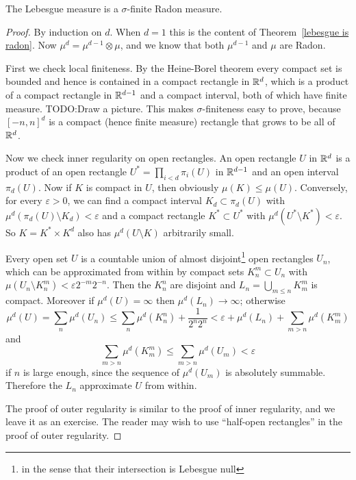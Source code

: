 \begin{theorem}
\label{lebesgue is radon 2}
The Lebesgue measure is a $\sigma$-finite Radon measure.
\end{theorem}
\begin{proof}
By induction on $d$. When $d = 1$ this is the content of Theorem~\ref{lebesgue is radon}.
Now $\mu^{d} = \mu^{d-1} \otimes \mu$, and we know that both $\mu^{d-1}$ and $\mu$ are Radon.

First we check local finiteness. By the Heine-Borel theorem every compact set is bounded and hence is contained in a compact rectangle in $\mathbb{R}^d$, which is a product of a compact rectangle in $\mathbb{R}^{d-1}$ and a compact interval, both of which have finite measure.
TODO:Draw a picture.
This makes $\sigma$-finiteness easy to prove, because $[-n, n]^d$ is a compact (hence finite measure) rectangle that grows to be all of $\mathbb{R}^d$.

Now we check inner regularity on open rectangles.
An open rectangle $U$ in $\mathbb{R}^d$ is a product of an open rectangle $U^* = \prod_{i<d} \pi_i(U)$ in $\mathbb{R}^{d-1}$ and an open interval $\pi_d(U)$.
Now if $K$ is compact in $U$, then obviously $\mu(K) \leq \mu(U)$.
Conversely, for every $\varepsilon > 0$, we can find a compact interval $K_{d} \subset \pi_d(U)$ with $\mu^d(\pi_d(U) \setminus K_d) < \varepsilon$ and a compact rectangle $K^* \subset U^*$ with $\mu^d(U^* \setminus K^*) < \varepsilon$. So $K = K^* \times K^d$ also has $\mu^d(U \setminus K)$ arbitrarily small.

Every open set $U$ is a countable union of almost disjoint\footnote{in the sense that their intersection is Lebesgue null} open rectangles $U_{n}$, which can be approximated from within by compact sets $K_{n}^{m} \subset U_{n}$ with $\mu(U_{n} \setminus K_{n}^m) < \varepsilon 2^{-m}2^{-n}$. Then the $K_{n}^n$ are disjoint and $L_{n} = \bigcup_{m \leq n} K_{m}^m$ is compact.
Moreover if $\mu^d(U) = \infty$ then $\mu^d(L_{n}) \to \infty$; otherwise
\[\mu^d(U) = \sum_{n} \mu^d(U_{n}) \leq \sum_{n} \mu^d(K_{n}^n) + \frac{1}{2^n2^n} < \varepsilon + \mu^d(L_{n}) + \sum_{m > n} \mu^d(K_{m}^m)\]
and
\[\sum_{m > n} \mu^d(K_{m}^m) \leq \sum_{m > n} \mu^d(U_{m}) < \varepsilon\]
if $n$ is large enough, since the sequence of $\mu^d(U_{m})$ is absolutely summable.
Therefore the $L_{n}$ approximate $U$ from within.

The proof of outer regularity is similar to the proof of inner regularity, and we leave it as an exercise.
The reader may wish to use ``half-open rectangles'' in the proof of outer regularity.
\end{proof}

